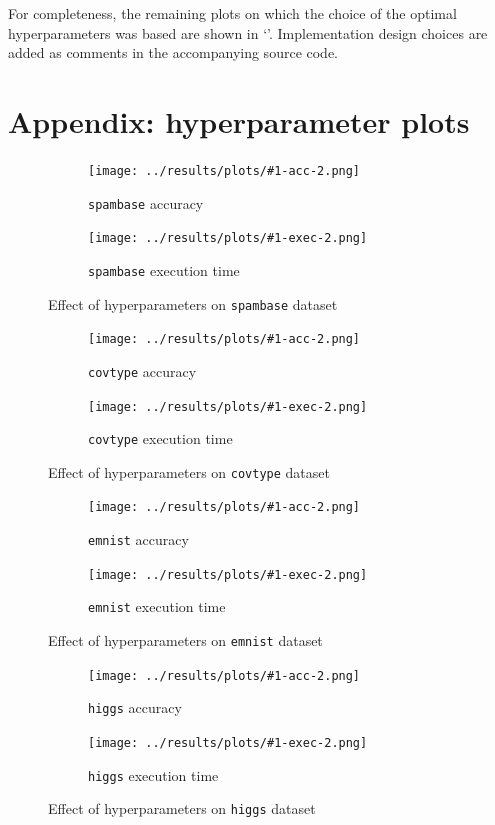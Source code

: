 \documentclass[10pt]{article}
\newcommand{\sbs}[1]{
	\begin{figure}[ht]
		\begin{subfigure}{.48\linewidth}
			\centering
			\texttt{[image: ../results/plots/\#1-acc-2.png]}
			\caption{\texttt{#1} accuracy}
			\label{fig:acc-#1}
		\end{subfigure}%
		\hfill
		\begin{subfigure}{.48\linewidth}
			\centering
			\texttt{[image: ../results/plots/\#1-exec-2.png]}
			\caption{\texttt{#1} execution time}
			\label{fig:exec-#1}
		\end{subfigure}
		\caption{Effect of hyperparameters on \texttt{#1} dataset}
		\label{fig:#1}
	\end{figure}
}
\begin{document}


\vspace{-.4cm}\noindent For completeness, the remaining plots on which the choice of the optimal hyperparameters was based are shown in `'. Implementation design choices are added as comments in the accompanying source code.


\appendix

\vspace{-.5cm}
\section*{Appendix: hyperparameter plots}\label{sec:app}

\sbs{spambase}
\sbs{covtype}
\sbs{emnist}
\sbs{higgs}
\end{document}
